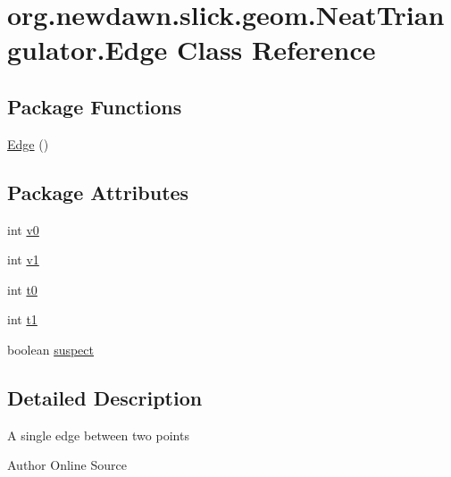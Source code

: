 \hypertarget{classorg_1_1newdawn_1_1slick_1_1geom_1_1_neat_triangulator_1_1_edge}{}\section{org.\+newdawn.\+slick.\+geom.\+Neat\+Triangulator.\+Edge Class Reference}
\label{classorg_1_1newdawn_1_1slick_1_1geom_1_1_neat_triangulator_1_1_edge}
\subsection*{Package Functions}
\begin{DoxyCompactItemize}
\item 
\mbox{\hyperlink{classorg_1_1newdawn_1_1slick_1_1geom_1_1_neat_triangulator_1_1_edge_af74c2e78955cd548b428d8c83c5e3b11}{Edge}} ()
\end{DoxyCompactItemize}
\subsection*{Package Attributes}
\begin{DoxyCompactItemize}
\item 
int \mbox{\hyperlink{classorg_1_1newdawn_1_1slick_1_1geom_1_1_neat_triangulator_1_1_edge_af3591a7a34d1b363ffdb86e57ba1301f}{v0}}
\item 
int \mbox{\hyperlink{classorg_1_1newdawn_1_1slick_1_1geom_1_1_neat_triangulator_1_1_edge_a149a98c39cb95e9ece5aa8747fc7e11a}{v1}}
\item 
int \mbox{\hyperlink{classorg_1_1newdawn_1_1slick_1_1geom_1_1_neat_triangulator_1_1_edge_a74e295c3081baba43bdd7fc93c758b37}{t0}}
\item 
int \mbox{\hyperlink{classorg_1_1newdawn_1_1slick_1_1geom_1_1_neat_triangulator_1_1_edge_a50747abaaa66c0c6c999206b3b61e467}{t1}}
\item 
boolean \mbox{\hyperlink{classorg_1_1newdawn_1_1slick_1_1geom_1_1_neat_triangulator_1_1_edge_a8c13f2c41069f6fbcfccb7ff5ed78e84}{suspect}}
\end{DoxyCompactItemize}


\subsection{Detailed Description}
A single edge between two points

\begin{DoxyAuthor}{Author}
Online Source 
\end{DoxyAuthor}


